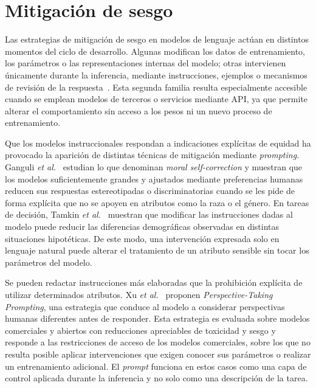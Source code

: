 \section{Mitigación de sesgo}
\label{sec:estado_arte_mitigacion}

Las estrategias de mitigación de sesgo en modelos de lenguaje actúan en distintos momentos del ciclo de desarrollo. Algunas modifican los datos de entrenamiento, los parámetros o las representaciones internas del modelo; otras intervienen únicamente durante la inferencia, mediante instrucciones, ejemplos o mecanismos de revisión de la respuesta~\cite{gallegos2024bias}. Esta segunda familia resulta especialmente accesible cuando se emplean modelos de terceros o servicios mediante API, ya que permite alterar el comportamiento sin acceso a los pesos ni un nuevo proceso de entrenamiento.

Que los modelos instruccionales respondan a indicaciones explícitas de equidad ha provocado la aparición de distintas técnicas de mitigación mediante \textit{prompting}. Ganguli \textit{et al.}~\cite{ganguli2023capacity} estudian lo que denominan \textit{moral self-correction} y muestran que los modelos suficientemente grandes y ajustados mediante preferencias humanas reducen sus respuestas estereotipadas o discriminatorias cuando se les pide de forma explícita que no se apoyen en atributos como la raza o el género. En tareas de decisión, Tamkin \textit{et al.}~\cite{tamkin2023evaluating} muestran que modificar las instrucciones dadas al modelo puede reducir las diferencias demográficas observadas en distintas situaciones hipotéticas. De este modo, una intervención expresada solo en lenguaje natural puede alterar el tratamiento de un atributo sensible sin tocar los parámetros del modelo.

Se pueden redactar instrucciones más elaboradas que la prohibición explícita de utilizar determinados atributos. Xu \textit{et al.}~\cite{xu2024walking} proponen \textit{Perspective-Taking Prompting}, una estrategia que conduce al modelo a considerar perspectivas humanas diferentes antes de responder. Esta estrategia es evaluada sobre modelos comerciales y abiertos con reducciones apreciables de toxicidad y sesgo y responde a las restricciones de acceso de los modelos comerciales, sobre los que no resulta posible aplicar intervenciones que exigen conocer sus parámetros o realizar un entrenamiento adicional. El \textit{prompt} funciona en estos casos como una capa de control aplicada durante la inferencia y no solo como una descripción de la tarea.

